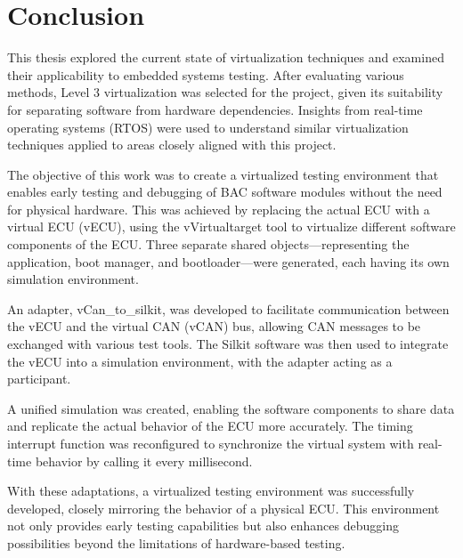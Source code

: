 
\chapter{Conclusion}\label{chapter:conclusion}

This thesis explored the current state of virtualization techniques and examined their applicability to embedded systems testing. After evaluating various methods, Level 3 virtualization was selected for the project, given its suitability for separating software from hardware dependencies. Insights from real-time operating systems (RTOS) were used to understand similar virtualization techniques applied to areas closely aligned with this project.

The objective of this work was to create a virtualized testing environment that enables early testing and debugging of BAC software modules without the need for physical hardware. This was achieved by replacing the actual ECU with a virtual ECU (vECU), using the vVirtualtarget tool to virtualize different software components of the ECU. Three separate shared objects—representing the application, boot manager, and bootloader—were generated, each having its own simulation environment.

An adapter, vCan\_to\_silkit, was developed to facilitate communication between the vECU and the virtual CAN (vCAN) bus, allowing CAN messages to be exchanged with various test tools. The Silkit software was then used to integrate the vECU into a simulation environment, with the adapter acting as a participant.

A unified simulation was created, enabling the software components to share data and replicate the actual behavior of the ECU more accurately. The timing interrupt function was reconfigured to synchronize the virtual system with real-time behavior by calling it every millisecond.

With these adaptations, a virtualized testing environment was successfully developed, closely mirroring the behavior of a physical ECU. This environment not only provides early testing capabilities but also enhances debugging possibilities beyond the limitations of hardware-based testing.
